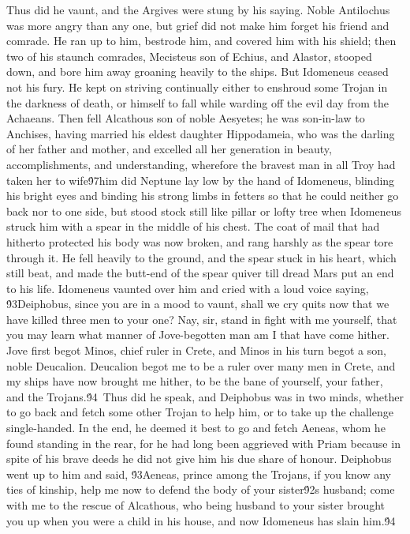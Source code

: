 {Thus did he vaunt, and the Argives were stung by his saying. Noble Antilochus was more angry than any one, but grief did not make him forget his friend and comrade. He ran up to him, bestrode him, and covered him with his shield; then two of his staunch comrades, Mecisteus son of Echius, and Alastor, stooped down, and bore him away groaning heavily to the ships. But Idomeneus ceased not his fury. He kept on striving continually either to enshroud some Trojan in the darkness of death, or himself to fall while warding off the evil day from the Achaeans. Then fell Alcathous son of noble Aesyetes; he was son-in-law to Anchises, having married his eldest daughter Hippodameia, who was the darling of her father and mother, and excelled all her generation in beauty, accomplishments, and understanding, wherefore the bravest man in all Troy had taken her to wife\'97him did Neptune lay low by the hand of Idomeneus, blinding his bright eyes and binding his strong limbs in fetters so that he could neither go back nor to one side, but stood stock still like pillar or lofty tree when Idomeneus struck him with a spear in the middle of his chest. The coat of mail that had hitherto protected his body was now broken, and rang harshly as the spear tore through it. He fell heavily to the ground, and the spear stuck in his heart, which still beat, and made the butt-end of the spear quiver till dread Mars put an end to his life. Idomeneus vaunted over him and cried with a loud voice saying, \'93Deiphobus, since you are in a mood to vaunt, shall we cry quits now that we have killed three men to your one? Nay, sir, stand in fight with me yourself, that you may learn what manner of Jove-begotten man am I that have come hither. Jove first begot Minos, chief ruler in Crete, and Minos in his turn begot a son, noble Deucalion. Deucalion begot me to be a ruler over many men in Crete, and my ships have now brought me hither, to be the bane of yourself, your father, and the Trojans.\'94\
Thus did he speak, and Deiphobus was in two minds, whether to go back and fetch some other Trojan to help him, or to take up the challenge single-handed. In the end, he deemed it best to go and fetch Aeneas, whom he found standing in the rear, for he had long been aggrieved with Priam because in spite of his brave deeds he did not give him his due share of honour. Deiphobus went up to him and said, \'93Aeneas, prince among the Trojans, if you know any ties of kinship, help me now to defend the body of your sister\'92s husband; come with me to the rescue of Alcathous, who being husband to your sister brought you up when you were a child in his house, and now Idomeneus has slain him.\'94\
}
